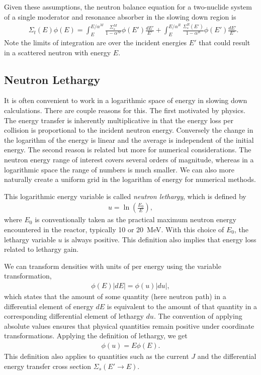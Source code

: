 Given these assumptions, the neutron balance equation for a two-nuclide system of a single moderator and resonance absorber in the slowing down region is
\begin{align}
  &\Sigma_t(E) \phi(E)  
  = \int_E^{E/\alpha^M} \frac{\Sigma_s^M}{ 1 - \alpha^M } \phi(E') \frac{dE'}{E'}
  + \int_E^{E/\alpha^R} \frac{\Sigma_s^R(E')}{ 1 - \alpha^R } \phi(E') \frac{dE'}{E'} .
\end{align}
Note the limits of integration are over the incident energies $E'$ that could result in a scattered neutron with energy $E$.

\subsection{Neutron Lethargy}

It is often convenient to work in a logarithmic space of energy in slowing down calculations. There are couple reasons for this. The first motivated by physics. The energy transfer is inherently multiplicative in that the energy loss per collision is proportional to the incident neutron energy. Conversely the change in the logarithm of the energy is linear and the average is independent of the initial energy. The second reason is related but more for numerical considerations. The neutron energy range of interest covers several orders of magnitude, whereas in a logarithmic space the range of numbers is much smaller. We can also more naturally create a uniform grid in the logarithm of energy for numerical methods.

This logarithmic energy variable is called \emph{neutron lethargy}, which is defined by
\begin{align}
  u = \ln \left( \frac{E_0}{E} \right) ,
\end{align}
where $E_0$ is conventionally taken as the practical maximum neutron energy encountered in the reactor, typically 10 or 20~MeV. With this choice of $E_0$, the lethargy variable $u$ is always positive. This definition also implies that energy loss related to lethargy gain.

We can transform densities with units of per energy using the variable transformation,
\begin{align}
  \phi(E) | dE | = \phi(u) | du |,
\end{align}
which states that the amount of some quantity (here neutron path) in a differential element of energy $dE$ is equivalent to the amount of that quantity in a corresponding differential element of lethargy $du$. The convention of applying absolute values ensures that physical quantities remain positive under coordinate transformations. Applying the definition of lethargy, we get
\begin{align}
  \phi(u) = E \phi(E) .
\end{align}
This definition also applies to quantities such as the current $J$ and the differential energy transfer cross section $\Sigma_s(E' \rightarrow E)$.

